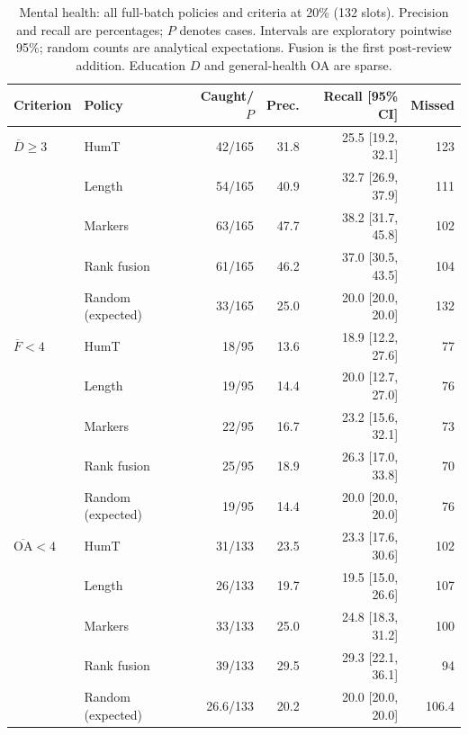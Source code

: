 \begin{table}[t]
\centering\small
\caption{Mental health: all full-batch policies and criteria at 20\% (132 slots). Precision and recall are percentages; $P$ denotes cases. Intervals are exploratory pointwise 95\%; random counts are analytical expectations. Fusion is the first post-review addition. Education $D$ and general-health OA are sparse.}
\label{tab:full_mental_health}
\begin{tabular}{llrrrr}
\toprule
Criterion & Policy & Caught/$P$ & Prec. & Recall [95\% CI] & Missed \\
\midrule
$\overline D\geq3$ & HumT & 42/165 & 31.8 & 25.5 [19.2, 32.1] & 123 \\
 & Length & 54/165 & 40.9 & 32.7 [26.9, 37.9] & 111 \\
 & Markers & 63/165 & 47.7 & 38.2 [31.7, 45.8] & 102 \\
 & Rank fusion & 61/165 & 46.2 & 37.0 [30.5, 43.5] & 104 \\
 & Random (expected) & 33/165 & 25.0 & 20.0 [20.0, 20.0] & 132 \\
$\overline F<4$ & HumT & 18/95 & 13.6 & 18.9 [12.2, 27.6] & 77 \\
 & Length & 19/95 & 14.4 & 20.0 [12.7, 27.0] & 76 \\
 & Markers & 22/95 & 16.7 & 23.2 [15.6, 32.1] & 73 \\
 & Rank fusion & 25/95 & 18.9 & 26.3 [17.0, 33.8] & 70 \\
 & Random (expected) & 19/95 & 14.4 & 20.0 [20.0, 20.0] & 76 \\
$\overline{\mathrm{OA}}<4$ & HumT & 31/133 & 23.5 & 23.3 [17.6, 30.6] & 102 \\
 & Length & 26/133 & 19.7 & 19.5 [15.0, 26.6] & 107 \\
 & Markers & 33/133 & 25.0 & 24.8 [18.3, 31.2] & 100 \\
 & Rank fusion & 39/133 & 29.5 & 29.3 [22.1, 36.1] & 94 \\
 & Random (expected) & 26.6/133 & 20.2 & 20.0 [20.0, 20.0] & 106.4 \\
\bottomrule
\end{tabular}
\end{table}
